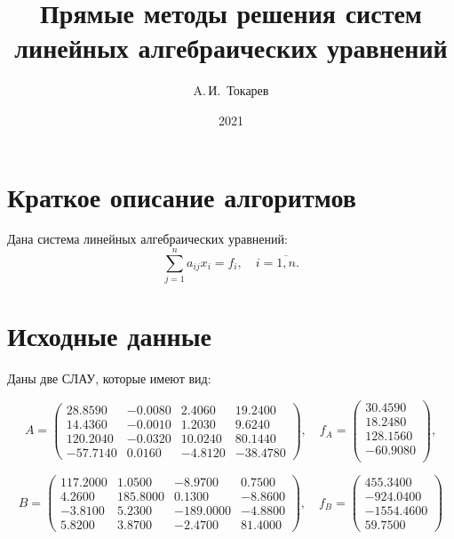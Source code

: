 \documentclass[12pt, a4paper]{article}
\title{Прямые методы решения систем линейных алгебраических уравнений}
\author{A.\,И.~Токарев}
\date{2021}
\begin{document}
\maketitle
\tableofcontents 
\newpage

\section{Краткое описание алгоритмов}
Дана система линейных алгебраических уравнений:
\begin{equation}
\sum_{j=1}^{n} a_{ij}x_i = f_i , \quad i = \overline{1,n}.
\label{Sys}
\end{equation}



\section{Исходные данные}
Даны две СЛАУ, которые имеют вид: 

\[
    A = 
    \begin{pmatrix}
     28.8590    &    -0.0080    &     2.4060    &    19.2400    \\   
     14.4360    &    -0.0010    &     1.2030    &     9.6240    \\   
    120.2040    &    -0.0320    &    10.0240    &    80.1440    \\  
    -57.7140    &     0.0160    &    -4.8120    &   -38.4780       

    \end{pmatrix}, \quad f_{A} = 
    \begin{pmatrix}
    30.4590  \\
    18.2480  \\
    128.1560 \\
    -60.9080 \\
    \end{pmatrix},
\]

\[
    B = 
    \begin{pmatrix}
        117.2000 &    1.0500   &    -8.9700 &    0.7500 \\
        4.2600  &    185.8000   &   0.1300 &   -8.8600  \\
        -3.8100  &    5.2300  &  -189.0000  &  -4.8800  \\
        5.8200  &      3.8700  &   -2.4700   &    81.4000   
    \end{pmatrix}, \quad f_{B} = 
    \begin{pmatrix}
       455.3400 \\
       -924.0400  \\
      -1554.4600  \\
        59.7500
    \end{pmatrix}
\]
\end{document}
